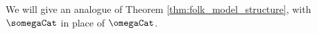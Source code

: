 \noindent We will give an analogue of Theorem \ref{thm:folk_model_structure}, with \( \somegaCat \) in place of \( \omegaCat \).




